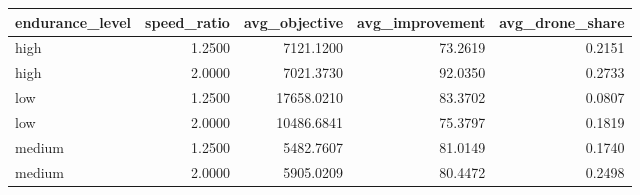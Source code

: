 \begin{tabular}{lrrrr}
\toprule
endurance_level & speed_ratio & avg_objective & avg_improvement & avg_drone_share \\
\midrule
high & 1.2500 & 7121.1200 & 73.2619 & 0.2151 \\
high & 2.0000 & 7021.3730 & 92.0350 & 0.2733 \\
low & 1.2500 & 17658.0210 & 83.3702 & 0.0807 \\
low & 2.0000 & 10486.6841 & 75.3797 & 0.1819 \\
medium & 1.2500 & 5482.7607 & 81.0149 & 0.1740 \\
medium & 2.0000 & 5905.0209 & 80.4472 & 0.2498 \\
\bottomrule
\end{tabular}
